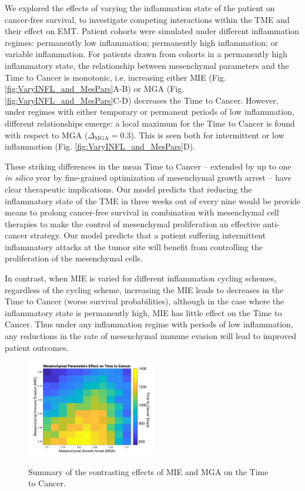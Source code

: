\documentclass[11pt]{article}
\begin{document}
We explored the effects of varying the inflammation state of the patient on cancer-free survival, to investigate competing interactions within the TME and their effect on EMT. Patient cohorts were simulated under different inflammation regimes: permanently low inflammation; permanently high inflammation; or variable inflammation. For patients drawn from cohorts in a permanently high inflammatory state, the relationship between mesenchymal parameters and the Time to Cancer is monotonic, i.e. increasing either MIE (Fig. \ref{fig:VaryINFL_and_MesPars}A-B) or MGA (Fig. \ref{fig:VaryINFL_and_MesPars}C-D) decreases the Time to Cancer.
However, under regimes with either temporary or permanent periods of low inflammation, different relationships emerge: a local maximum for the Time to Cancer is found with respect to MGA ($\Delta_\text{MGA}= 0.3$). This is seen both for intermittent or low inflammation (Fig. \ref{fig:VaryINFL_and_MesPars}D). 
\par
These striking differences in the mean Time to Cancer -- extended by up to one {\it in silico} year by fine-grained optimization of mesenchymal growth arrest -- have clear therapeutic implications. 
Our model predicts that reducing the inflammatory state of the TME in three weeks out of every nine would be provide means to prolong cancer-free survival in combination with mesenchymal cell therapies to make the control of mesenchymal proliferation an effective anti-cancer strategy.
Our model predicts that a patient suffering intermittent inflammatory attacks at the tumor site will benefit from controlling the proliferation of the mesenchymal cells.
\par
In contrast, when MIE is varied for different inflammation cycling schemes, regardless of the cycling scheme, increasing the MIE leads to decreases in the Time to Cancer (worse survival probabilities), although in the case where the inflammatory state is permanently high, MIE has little effect on the Time to Cancer. Thus under any inflammation regime with periods of low inflammation, any reductions in the rate of mesenchymal immune evasion will lead to improved patient outcomes.

\begin{figure}
\center
{\includegraphics[width=0.5\textwidth]{Figure5/MIEvsMGA_bigcbar.jpg}}
\caption{Summary of the contrasting effects of MIE and MGA on the Time to Cancer.
}
\label{fig:MIEvsMGA}
\end{figure}
\end{document}
